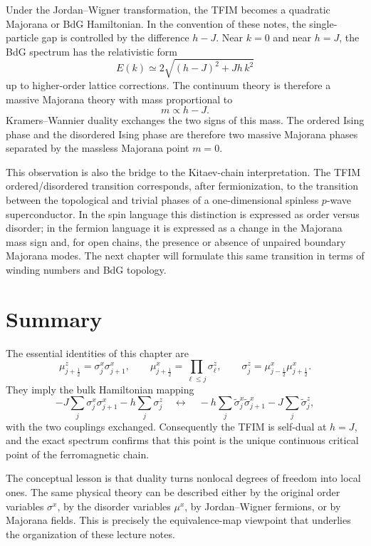 Under the Jordan--Wigner transformation, the TFIM becomes a quadratic Majorana
or BdG Hamiltonian.  In the convention of these notes, the single-particle gap is
controlled by the difference $h-J$.  Near $k=0$ and near $h=J$, the BdG spectrum
has the relativistic form
\begin{equation}
\label{eq:duality-majorana-low-energy-spectrum}
    E(k)
    \simeq
    2\sqrt{(h-J)^2+J h\, k^2}
\end{equation}
up to higher-order lattice corrections.  The continuum theory is therefore a
massive Majorana theory with mass proportional to
\begin{equation}
\label{eq:duality-majorana-mass}
    m\propto h-J.
\end{equation}
Kramers--Wannier duality exchanges the two signs of this mass.  The ordered
Ising phase and the disordered Ising phase are therefore two massive Majorana
phases separated by the massless Majorana point $m=0$.

This observation is also the bridge to the Kitaev-chain interpretation.  The
TFIM ordered/disordered transition corresponds, after fermionization, to the
transition between the topological and trivial phases of a one-dimensional
spinless $p$-wave superconductor.  In the spin language this distinction is
expressed as order versus disorder; in the fermion language it is expressed as a
change in the Majorana mass sign and, for open chains, the presence or absence
of unpaired boundary Majorana modes.  The next chapter will formulate this same
transition in terms of winding numbers and BdG topology.

\section{Summary}
\label{sec:duality-summary}

The essential identities of this chapter are
\begin{equation}
\label{eq:duality-summary-identities}
    \mu_{j+\frac12}^z=\sigma_j^x\sigma_{j+1}^x,
    \qquad
    \mu_{j+\frac12}^x=\prod_{\ell\leq j}\sigma_\ell^z,
    \qquad
    \sigma_j^z=\mu_{j-\frac12}^x\mu_{j+\frac12}^x .
\end{equation}
They imply the bulk Hamiltonian mapping
\begin{equation}
\label{eq:duality-summary-hamiltonian-map}
    -J\sum_j\sigma_j^x\sigma_{j+1}^x
    -h\sum_j\sigma_j^z
    \quad\longleftrightarrow\quad
    -h\sum_j\widetilde{\sigma}_j^x\widetilde{\sigma}_{j+1}^x
    -J\sum_j\widetilde{\sigma}_j^z,
\end{equation}
with the two couplings exchanged.  Consequently the TFIM is self-dual at
$h=J$, and the exact spectrum confirms that this point is the unique continuous
critical point of the ferromagnetic chain.

The conceptual lesson is that duality turns nonlocal degrees of freedom into
local ones.  The same physical theory can be described either by the original
order variables $\sigma^x$, by the disorder variables $\mu^x$, by Jordan--Wigner
fermions, or by Majorana fields.  This is precisely the equivalence-map viewpoint
that underlies the organization of these lecture notes.
